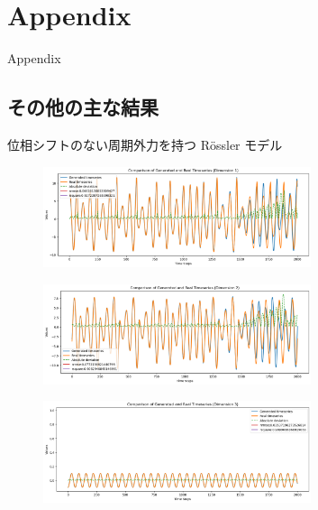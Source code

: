 \section{Appendix}

\begin{frame}
    \begin{center}
        \LARGE Appendix
    \end{center}
\end{frame}

\subsection{その他の主な結果}


\begin{frame}{位相シフトのない周期外力を持つ Rössler モデル}  
    \begin{minipage}{0.59\textwidth}
        \vspace{0.5em}
        \begin{figure}
                \includegraphics[width=0.7\textwidth]{Fig/rossler_+sin_1.png}
                \label{rossler_+sin_1.png} %
            \end{figure}
            \vspace{-1.0cm}
            \begin{figure}
                \includegraphics[width=0.7\textwidth]{Fig/rossler_+sin_2.png}
                \label{rossler_+sin_2.png} %
            \end{figure}
            \vspace{-1.0cm}
            \begin{figure}
                \includegraphics[width=0.7\textwidth]{Fig/rossler_+sin_3.png}

\end{figure}
\end{minipage}
\end{frame}
